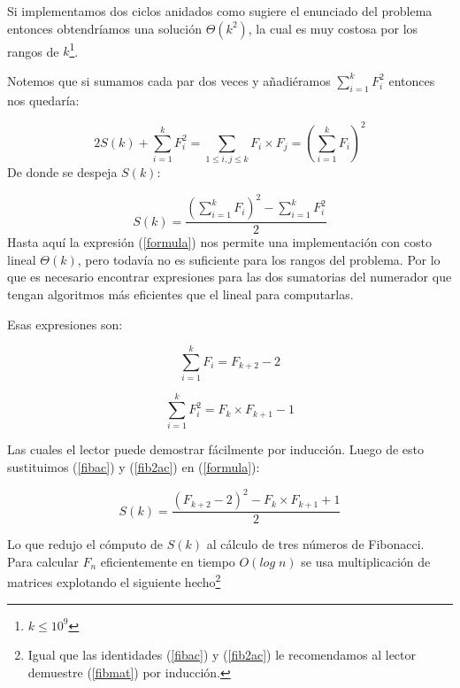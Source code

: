 \documentclass[a4paper,10pt]{article}
\begin{document}
Si implementamos dos ciclos anidados como sugiere el enunciado
del problema entonces obtendr\'iamos una soluci\'on $\Theta(k^2)$, la cual
es muy costosa por los rangos de $k$\footnote{$k \le 10^9$}.

Notemos que si sumamos cada par dos veces y a\~nadi\'eramos $\sum_{i=1}^{k} F^2_i$ entonces nos quedar\'ia:

\begin{equation}
 2S(k) + \sum_{i=1}^{k} F^2_i = \sum_{1 \le i, j \le k} F_i \times F_j = \left(\sum_{i=1}^k F_i\right)^2
\end{equation}
De donde se despeja $S(k)$:

\begin{equation}
 S(k) = \frac{ \left(\sum_{i=1}^k F_i\right)^2 - \sum_{i=1}^{k} F^2_i } {2}
 \label{formula}
\end{equation}
Hasta aqu\'i la expresi\'on (\ref{formula}) nos permite una implementaci\'on con costo lineal $\Theta(k)$, pero todav\'ia no
es suficiente para los rangos del problema. Por lo que es necesario encontrar expresiones para las dos sumatorias del
numerador que tengan algoritmos m\'as eficientes que el lineal para computarlas.

Esas expresiones son: 

\begin{equation}
 \sum_{i=1}^k F_i = F_{k + 2} - 2
 \label{fibac}
\end{equation}

\begin{equation}
 \sum_{i=1}^k F_i^2 = F_k \times F_{k + 1} - 1
 \label{fib2ac}
\end{equation}

Las cuales el lector puede demostrar f\'acilmente por inducci\'on. Luego de esto sustituimos (\ref{fibac}) y (\ref{fib2ac})
en (\ref{formula}):

\begin{equation}
 S(k) = \frac{ (F_{k + 2} - 2)^2 - F_k\times F_{k+1} + 1 }{2}
\end{equation}

Lo que redujo el c\'omputo de $S(k)$ al c\'alculo de tres n\'umeros de Fibonacci. Para calcular $F_n$ eficientemente
en tiempo $O(log\; n)$ se usa multiplicaci\'on de matrices explotando el siguiente hecho\footnote{Igual que las identidades (\ref{fibac}) y (\ref{fib2ac})
le recomendamos al lector demuestre (\ref{fibmat}) por inducci\'on.}
\end{document}
